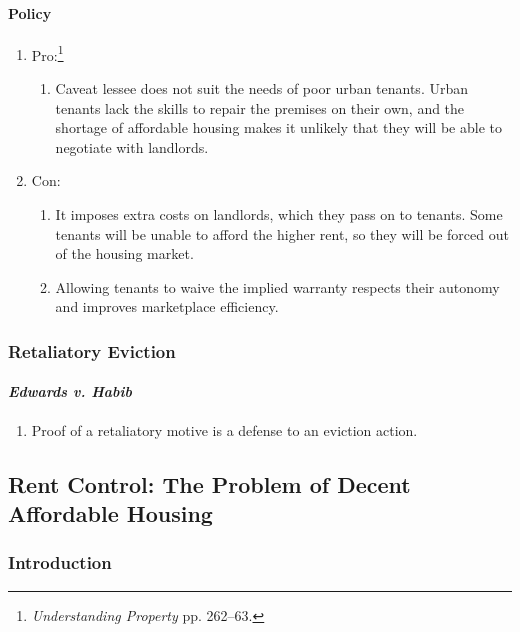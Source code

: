 \paragraph{Policy}

\begin{enumerate}
    \item Pro:\footnote{\emph{Understanding Property} pp. 262--63.}
    \begin{enumerate}
        \item Caveat lessee does not suit the needs of poor urban tenants. 
        Urban tenants lack the skills to repair the premises on their own, and 
        the shortage of affordable housing makes it unlikely that they will be 
        able to negotiate with landlords.
    \end{enumerate}
    \item Con:
    \begin{enumerate}
        \item It imposes extra costs on landlords, which they pass on to 
        tenants. Some tenants will be unable to afford the higher rent, so 
        they will be forced out of the housing market.
        \item Allowing tenants to waive the implied warranty respects their 
        autonomy and improves marketplace efficiency.
    \end{enumerate}
\end{enumerate}

\subsubsection{Retaliatory Eviction}

\paragraph{\emph{Edwards v. Habib}}

\begin{enumerate}
    \item Proof of a retaliatory motive is a defense to an eviction action.
\end{enumerate}

\subsection{Rent Control: The Problem of Decent Affordable Housing} 

\subsubsection{Introduction}


